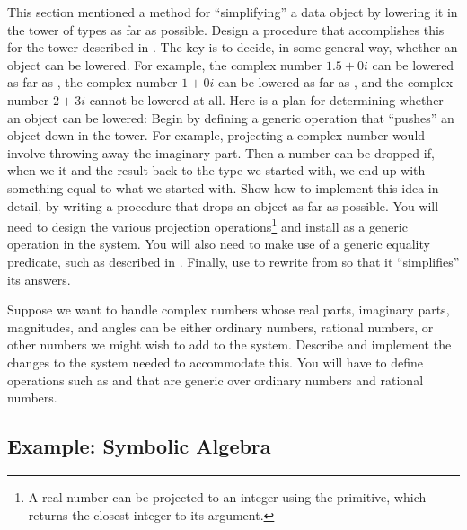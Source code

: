 \begin{exerciseGroup}
\label{Exercise 2.85}
 This section mentioned a method
for ``simplifying'' a data object by lowering it in the tower of types as far
as possible.  Design a procedure  that accomplishes this for the
tower described in .  The key is to decide, in some general
way, whether an object can be lowered.  For example, the complex number
\( 1.5 + 0i \) can be lowered as far as , the complex number \( 1 + 0i \) can
be lowered as far as , and the complex number \( 2 + 3i \) cannot
be lowered at all.  Here is a plan for determining whether an object can be
lowered: Begin by defining a generic operation  that ``pushes''
an object down in the tower.  For example, projecting a complex number would
involve throwing away the imaginary part.  Then a number can be dropped if,
when we  it and  the result back to the type we
started with, we end up with something equal to what we started with.  Show how
to implement this idea in detail, by writing a  procedure that drops
an object as far as possible.  You will need to design the various projection
operations\footnote{A real number can be projected to an integer using the
 primitive, which returns the closest integer to its argument.} and
install  as a generic operation in the system.  You will also
need to make use of a generic equality predicate, such as described in
.  Finally, use  to rewrite 
from  so that it ``simplifies'' its answers.

\label{Exercise 2.86}
 Suppose we want to handle complex
numbers whose real parts, imaginary parts, magnitudes, and angles can be either
ordinary numbers, rational numbers, or other numbers we might wish to add to
the system.  Describe and implement the changes to the system needed to
accommodate this.  You will have to define operations such as  and
 that are generic over ordinary numbers and rational numbers.
\end{exerciseGroup}

\subsection{Example: Symbolic Algebra}
\label{Section 2.5.3}

